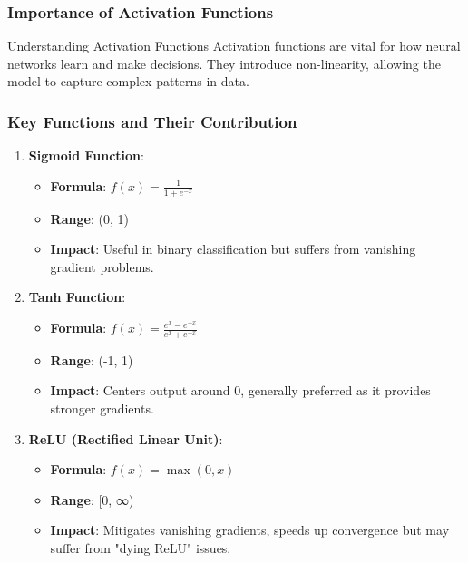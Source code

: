 \documentclass[aspectratio=169]{beamer}
\begin{document}
\begin{frame}[fragile]
    \frametitle{Importance of Activation Functions}
    \begin{block}{Understanding Activation Functions}
        Activation functions are vital for how neural networks learn and make decisions. They introduce non-linearity, allowing the model to capture complex patterns in data.
    \end{block}
\end{frame}

\begin{frame}[fragile]
    \frametitle{Key Functions and Their Contribution}
    \begin{enumerate}
        \item \textbf{Sigmoid Function}:
        \begin{itemize}
            \item \textbf{Formula}: \( f(x) = \frac{1}{1 + e^{-x}} \)
            \item \textbf{Range}: (0, 1)
            \item \textbf{Impact}: Useful in binary classification but suffers from vanishing gradient problems.
        \end{itemize}

        \item \textbf{Tanh Function}:
        \begin{itemize}
            \item \textbf{Formula}: \( f(x) = \frac{e^{x} - e^{-x}}{e^{x} + e^{-x}} \)
            \item \textbf{Range}: (-1, 1)
            \item \textbf{Impact}: Centers output around 0, generally preferred as it provides stronger gradients.
        \end{itemize}
        
        \item \textbf{ReLU (Rectified Linear Unit)}:
        \begin{itemize}
            \item \textbf{Formula}: \( f(x) = \max(0, x) \)
            \item \textbf{Range}: [0, ∞)
            \item \textbf{Impact}: Mitigates vanishing gradients, speeds up convergence but may suffer from "dying ReLU" issues.
        \end{itemize}
    \end{enumerate}
\end{frame}
\end{document}
